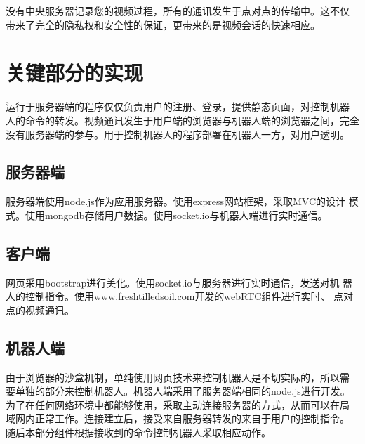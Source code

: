 没有中央服务器记录您的视频过程，所有的通讯发生于点对点的传输中。这不仅
带来了完全的隐私权和安全性的保证，更带来的是视频会话的快速相应。

\section{关键部分的实现}

运行于服务器端的程序仅仅负责用户的注册、登录，提供静态页面，对控制机器
人的命令的转发。视频通讯发生于用户端的浏览器与机器人端的浏览器之间，完全
没有服务器端的参与。用于控制机器人的程序部署在机器人一方，对用户透明。

\subsection{服务器端}

服务器端使用node.js作为应用服务器。使用express网站框架，采取MVC的设计
模式。使用mongodb存储用户数据。使用socket.io与机器人端进行实时通信。

\subsection{客户端}

网页采用bootstrap进行美化。使用socket.io与服务器进行实时通信，发送对机
器人的控制指令。使用www.freshtilledsoil.com开发的webRTC组件进行实时、
点对点的视频通讯。

\subsection{机器人端}

由于浏览器的沙盒机制，单纯使用网页技术来控制机器人是不切实际的，所以需
要单独的部分来控制机器人。机器人端采用了服务器端相同的node.js进行开发。
为了在任何网络环境中都能够使用，采取主动连接服务器的方式，从而可以在局
域网内正常工作。连接建立后，接受来自服务器转发的来自于用户的控制指令。
随后本部分组件根据接收到的命令控制机器人采取相应动作。
